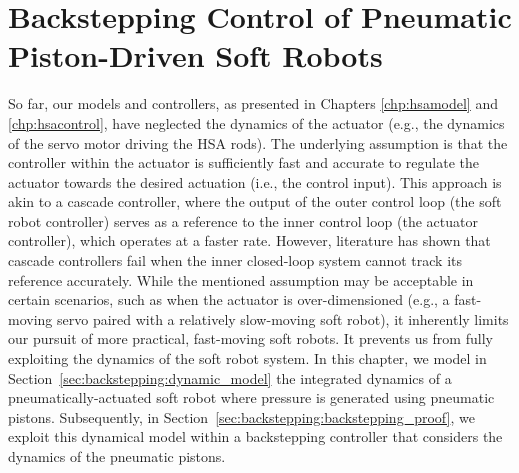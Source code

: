 \chapter{Backstepping Control of Pneumatic Piston-Driven Soft Robots}
\label{chp:backstepping}

\begin{foreword}
    So far, our models and controllers, as presented in Chapters \ref{chp:hsamodel} and \ref{chp:hsacontrol}, have neglected the dynamics of the actuator (e.g., the dynamics of the servo motor driving the \gls{HSA} rods). The underlying assumption is that the controller within the actuator is sufficiently fast and accurate to regulate the actuator towards the desired actuation (i.e., the control input). This approach is akin to a cascade controller, where the output of the outer control loop (the soft robot controller) serves as a reference to the inner control loop (the actuator controller), which operates at a faster rate.
    However, literature has shown that cascade controllers fail when the inner closed-loop system cannot track its reference accurately. While the mentioned assumption may be acceptable in certain scenarios, such as when the actuator is over-dimensioned (e.g., a fast-moving servo paired with a relatively slow-moving soft robot), it inherently limits our pursuit of more practical, fast-moving soft robots. It prevents us from fully exploiting the dynamics of the soft robot system.
    In this chapter, we model in Section~\ref{sec:backstepping:dynamic_model} the integrated dynamics of a pneumatically-actuated soft robot where pressure is generated using pneumatic pistons. Subsequently, in Section~\ref{sec:backstepping:backstepping_proof}, we exploit this dynamical model within a backstepping controller that considers the dynamics of the pneumatic pistons.
\end{foreword}


